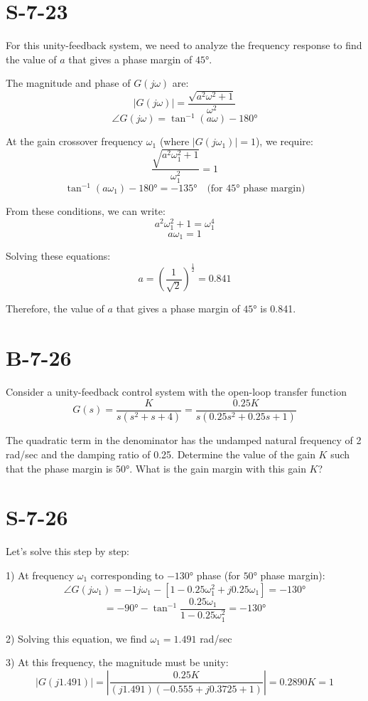 \documentclass{article}
\begin{document}
\section*{S-7-23}
For this unity-feedback system, we need to analyze the frequency response to find the value of $a$ that gives a phase margin of $45°$.

The magnitude and phase of $G(j\omega)$ are:
\[
|G(j\omega)| = \frac{\sqrt{a^2\omega^2 + 1}}{\omega^2}
\]
\[
\angle G(j\omega) = \tan^{-1}(a\omega) - 180°
\]

At the gain crossover frequency $\omega_1$ (where $|G(j\omega_1)| = 1$), we require:
\[
\frac{\sqrt{a^2\omega_1^2 + 1}}{\omega_1^2} = 1
\]
\[
\tan^{-1}(a\omega_1) - 180° = -135° \quad \text{(for 45° phase margin)}
\]

From these conditions, we can write:
\[
a^2\omega_1^2 + 1 = \omega_1^4
\]
\[
a\omega_1 = 1
\]

Solving these equations:
\[
a = \left(\frac{1}{\sqrt{2}}\right)^{\frac{1}{2}} = 0.841
\]

Therefore, the value of $a$ that gives a phase margin of $45°$ is 0.841.
\section*{B-7-26}
Consider a unity-feedback control system with the open-loop transfer function
\[
G(s) = \frac{K}{s(s^2 + s + 4)} = \frac{0.25K}{s(0.25s^2 + 0.25s + 1)}
\]

The quadratic term in the denominator has the undamped natural frequency of 2 rad/sec and the damping ratio of 0.25. Determine the value of the gain $K$ such that the phase margin is $50°$. What is the gain margin with this gain $K$?

\section*{S-7-26}
Let's solve this step by step:

1) At frequency $\omega_1$ corresponding to $-130°$ phase (for $50°$ phase margin):
\[
\angle G(j\omega_1) = -1j\omega_1 - [1-0.25\omega_1^2 + j0.25\omega_1] = -130°
\]
\[
= -90° - \tan^{-1}\frac{0.25\omega_1}{1-0.25\omega_1^2} = -130°
\]

2) Solving this equation, we find $\omega_1 = 1.491$ rad/sec

3) At this frequency, the magnitude must be unity:
\[
|G(j1.491)| = \left|\frac{0.25K}{(j1.491)(-0.555 + j0.3725 + 1)}\right| = 0.2890K = 1
\]
\end{document}
